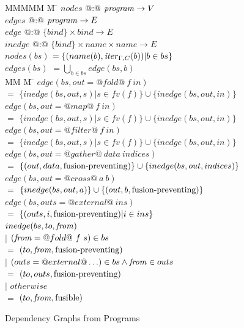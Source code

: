 \begin{figure}
\begin{tabbing}
MMMMM       \= M  \= \kill
$nodes$     \> @:@ \> $\mathit{program} \to V$                          \\
$edges$     \> @:@ \> $\mathit{program} \to E$                          \\
$edge$      \> @:@ \> $\{bind\} \times bind \to E$              \\
$inedge$    \> @:@ \> $\{bind\} \times name \times name \to E$
\\[1ex]
$nodes(bs)$ \> $= \{(name(b), \mathit{iter}_{\Gamma,C}(b)) | b \in bs\}$
\\[1ex]
$edges(bs)$ \> $= \bigcup_{b \in bs}edge(bs, b)$
\\[1ex]
MM             \= M \= \kill
$edge(bs, out = @fold@~f~in)$ \\
    \> $=$    \> $\{inedge(bs,out,s) | s \in fv(f)\} \cup \{inedge(bs, out, in) \}$
\\
$edge(bs, out = @map@~f~in)$  \\
    \> $=$    \> $\{inedge(bs,out,s) | s \in fv(f)\} \cup \{inedge(bs, out, in) \}$
\\
$edge(bs, out = @filter@~f~in)$ \\
    \> $=$    \> $\{inedge(bs,out,s) | s \in fv(f)\} \cup \{inedge(bs, out, in) \}$
\\
$edge(bs, out = @gather@~data~indices)$ \\
    \> $=$    \> $\{(out,data, \mbox{fusion-preventing}) \} \cup \{inedge(bs, out, indices) \}$      
\\
$edge(bs, out = @cross@~a~b)$ \\
    \> $=$    \> $\{inedge(bs, out, a) \}           \cup      \{(out, b, \mbox{fusion-preventing}) \}$
\\
$edge(bs, outs = @external@~ins)$  \\
    \> $=$    \> $\{(outs,i, \mbox{fusion-preventing}) | i \in ins \}$
\\[1ex]
$inedge(bs,to,\mathit{from})$ \\
    \> $|$ \> $(\mathit{from} = @fold@~f~s) \in bs$     \\
    \> $=$ \> $(to, \mathit{from}, \mbox{fusion-preventing})$  \\
    \> $|$ \> $(outs = @external@ \ldots) \in bs     \wedge \mathit{from} \in outs$     \\
    \> $=$ \> $(to, outs, \mbox{fusion-preventing})$  \\
    \> $|$ \> $otherwise$                      \\
    \> $=$ \> $(to, \mathit{from}, \mathrm{fusible})$
\end{tabbing}

\caption{Dependency Graphs from Programs}
\label{clustering:f:DependencyGraph}
\end{figure}


